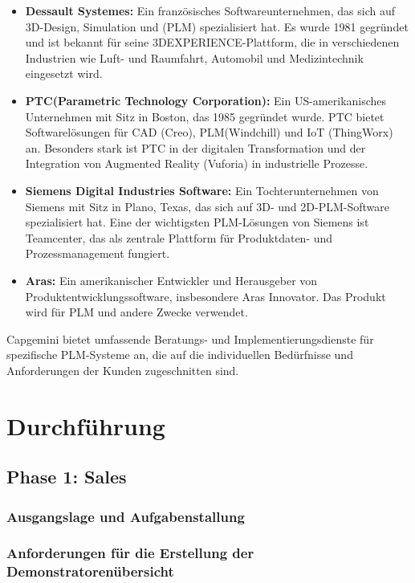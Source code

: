 \documentclass[a4paper, 12pt]{scrartcl}
\begin{document}
	\begin{itemize}
		\item \textbf{Dessault Systemes\cite{Dessault}:} Ein französisches Softwareunternehmen, das sich auf 3D-Design, Simulation und  (PLM) spezialisiert hat. Es wurde 1981 gegründet und ist bekannt für seine 3DEXPERIENCE-Plattform, die in verschiedenen Industrien wie Luft- und Raumfahrt, Automobil und Medizintechnik eingesetzt wird.
		\item \textbf{PTC(Parametric Technology Corporation)\cite{PTC}:} Ein US-amerikanisches Unternehmen mit Sitz in Boston, das 1985 gegründet wurde. PTC bietet Softwarelösungen für CAD (Creo), PLM(Windchill) und IoT (ThingWorx) an. Besonders stark ist PTC in der digitalen Transformation und der Integration von Augmented Reality (Vuforia) in industrielle Prozesse.
		\item \textbf{Siemens Digital Industries Software\cite{Siemens}:} Ein Tochterunternehmen von Siemens mit Sitz in Plano, Texas, das sich auf 3D- und 2D-PLM-Software spezialisiert hat.  Eine der wichtigsten PLM-Lösungen von Siemens ist Teamcenter, das als zentrale Plattform für Produktdaten- und Prozessmanagement fungiert.
		\item \textbf{Aras\cite{Aras}:} Ein amerikanischer Entwickler und Herausgeber von Produktentwicklungssoftware, insbesondere Aras Innovator. Das Produkt wird für PLM und andere Zwecke verwendet.
	\end{itemize}
	Capgemini bietet umfassende Beratungs- und Implementierungsdienste für spezifische PLM-Systeme an, die auf die individuellen Bedürfnisse und Anforderungen der Kunden zugeschnitten sind. 
	\section{Durchführung}
	\subsection{Phase 1: Sales} 
	\subsubsection{Ausgangslage und Aufgabenstallung} %
	\subsubsection{Anforderungen für die Erstellung der Demonstratorenübersicht} %
\end{document}
